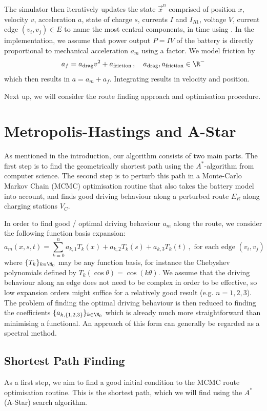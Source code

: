 \documentclass{prettytex/ox/mmsc-special-topic}
\begin{document}
  The simulator then iteratively updates the state $\vec{x}^n$ comprised of position $x$, velocity $v$, acceleration $a$, state of charge $s$, currents $I$ and $I_{R1}$, voltage $V$, current edge $(v_i, v_j) \in E$ to name the most central components, in time using .
  In the implementation, we assume that power output $P = IV$ of the battery is directly proportional to mechanical acceleration $a_m$ using a factor.
  We model friction by $$a_f = a_{\rm drag} v^2 + a_{\rm friction}\,,\quad a_{\rm drag}, a_{\rm friction} \in \R^-$$ which then results in $a = a_m + a_f$.
  Integrating results in velocity and position.

  Next up, we will consider the route finding approach and optimisation procedure.

  \section{Metropolis-Hastings and A-Star}
  As mentioned in the introduction, our algorithm consists of two main parts.
  The first step is to find the geometrically shortest path using the $A^*$-algorithm from computer science.
  The second step is to perturb this path in a Monte-Carlo Markov Chain (MCMC) optimisation routine that also takes the battery model into account, and finds good driving behaviour along a perturbed route $E_R$ along charging stations $V_C$.

  In order to find good / optimal driving behaviour $a_m$ along the route, we consider the following function basis expansion:
  \begin{equation}
    a_m(x, s, t) = \sum_{k=0}^{n} a_{k,1} T_k(x) + a_{k,2} T_k(s) + a_{k,3} T_k(t)\,, \text{ for each edge } (v_i, v_j)
    \label{eq:spectral-expansion}
  \end{equation}
  where $\{T_k\}_{k\in \N_0}$ may be any function basis, for instance the Chebyshev polynomials defined by $T_k(\cos \theta) = \cos(k\theta)$.
  We assume that the driving behaviour along an edge does not need to be complex in order to be effective, so low expansion orders might suffice for a relatively good result (e.g. $n = 1, 2, 3$).
  The problem of finding the optimal driving behaviour is then reduced to finding the coefficients $\{a_{k,\{1,2,3\}}\}_{k\in\N_0}$ which is already much more straightforward than minimising a functional.
  An approach of this form can generally be regarded as a spectral method.

  \subsection{Shortest Path Finding}
  As a first step, we aim to find a good initial condition to the MCMC route optimisation routine.
  This is the shortest path, which we will find using the $A^*$ (A-Star) search algorithm.
\end{document}

